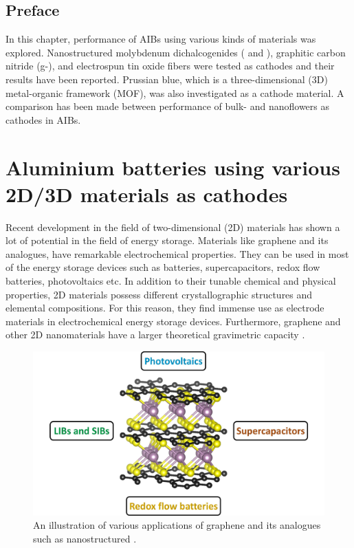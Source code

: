 \section*{Preface}
In this chapter, performance of AIBs using various kinds of materials was explored. Nanostructured molybdenum dichalcogenides ( and ), graphitic carbon nitride (g-), and electrospun tin oxide  fibers were tested as cathodes and their results have been reported. Prussian blue, which is a three-dimensional (3D) metal-organic framework (MOF), was also investigated as a cathode material. A comparison has been made between performance of bulk- and  nanoflowers as cathodes in AIBs. 
\pagebreak
\chapter{Aluminium batteries using various 2D/3D materials as cathodes} 
\label{chap6} 
Recent development in the field of two-dimensional (2D) materials has shown a lot of potential in the field of energy storage. Materials like graphene and its analogues, have remarkable electrochemical properties. They can be used in most of the energy storage devices such as batteries, supercapacitors, redox flow batteries, photovoltaics etc. In addition to their tunable chemical and physical properties, 2D materials possess different crystallographic structures and elemental compositions. For this reason, they find immense use as electrode materials in electrochemical energy storage devices\cite{wang_graphene_2009,bonaccorso_graphene_2015}. Furthermore, graphene and other 2D nanomaterials have a larger theoretical gravimetric capacity \cite{zhou_progress_2014}. 

\begin{figure}[h!]
  \centering
  \includegraphics[width=\textwidth]{Figures/chap6fig/nanoTMDintro.pdf}
    \caption{An illustration of various applications of graphene and its analogues such as nanostructured .}
  \label{Figures/chap6fig:nanoTMDintro}
\end{figure}

